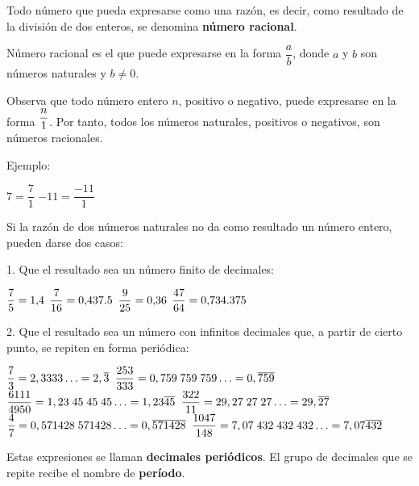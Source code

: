 

Todo número que pueda expresarse como una razón, es decir, como resultado 
de la división de dos enteros, se denomina \textbf{número racional}.

\begin{defbox}
Número racional es el que puede expresarse en la forma $\dfrac{a}{b}$,  
donde $a$ y $b$ son números naturales y $b \neq 0$.
\end{defbox}

Observa que todo número entero $n$, positivo o negativo, puede expresarse en 
la forma $\nfrac[4pt]{n}{1}$. Por tanto, todos los números naturales, positivos o 
negativos, son números racionales.
\newpage

Ejemplo: 

\begin{ejemplosplain}[2]
  \task $7 = \dfrac{7}{1}$
  \task $-11 = \dfrac{-11}{1}$
\end{ejemplosplain}

Si la razón de dos números naturales no da como resultado un número entero, 
pueden darse dos casos:

1. Que el resultado sea un número finito de decimales:

\noindent {}

\begin{ejemplos}[2][(\alph*)]
  \task $\dfrac{7}{5} = \numes{1.4}$
  \task $\dfrac{7}{16} = \numes{0.4375}$
  \task $\dfrac{9}{25} = \numes{0.36}$
  \task $\dfrac{47}{64} = \numes{0.734375}$
\end{ejemplos}


2. Que el resultado sea un número con infinitos decimales que, a partir
   de cierto punto, se repiten en forma periódica:

\begin{ejemplos}[2][(\alph*)]
  \task $\dfrac{7}{3} = 2,3333\ldots = 2,\overline{3}$
  \task $\dfrac{253}{333} = 0,759\;759\;759\ldots = 0,\overline{759}$
  \task $\dfrac{6111}{4950} = 1,23\;45\;45\;45\ldots = 1,23\overline{45}$
  \task $\dfrac{322}{11} = 29,27\;27\;27\ldots = 29,\overline{27}$
  \task $\dfrac{4}{7} = 0,571428\;571428\ldots = 0,\overline{571428}$
  \task $\dfrac{1047}{148} = 7,07\;432\;432\;432\ldots = 7,07\overline{432}$
\end{ejemplos}


Estas expresiones se llaman \textbf{decimales periódicos}. 
El grupo de decimales que se repite recibe el nombre de \textbf{período}.  

